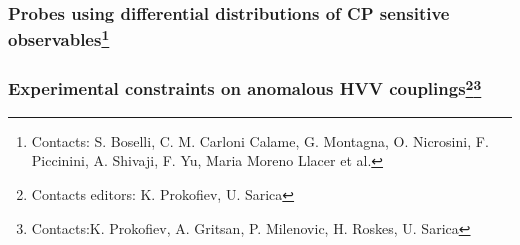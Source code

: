 \subsubsection[Probes using differential distributions of CP sensitive observables]{Probes using differential distributions of CP sensitive observables\footnote{Contacts: S. Boselli, C. M. Carloni Calame, G. Montagna,  O. Nicrosini, F. Piccinini, A. Shivaji, F. Yu, Maria Moreno Llacer et al.}}


\subsubsection[Experimental constraints on anomalous HVV couplings]{Experimental constraints on anomalous HVV couplings\footnote{Contacts editors: K. Prokofiev, U. Sarica}\footnote{Contacts:K. Prokofiev,  A. Gritsan, P. Milenovic, H. Roskes, U. Sarica}}
\label{subsection:ACHVVdecay}



